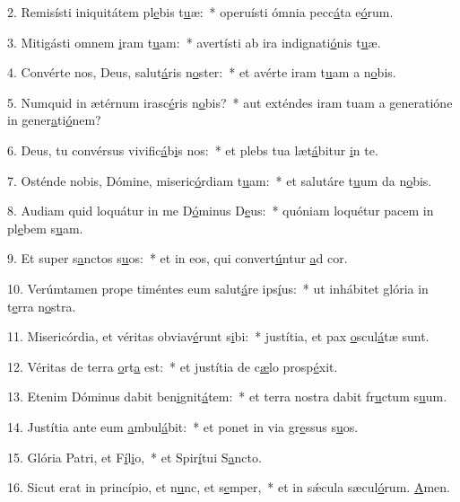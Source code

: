 2. Remisísti iniquitátem pl\uline{e}bis t\uline{u}æ:~* operuísti ómnia pecc\uline{á}ta e\uline{ó}rum.\par 
3. Mitigásti omnem \uline{i}ram t\uline{u}am:~* avertísti ab ira indignati\uline{ó}nis t\uline{u}æ.\par 
4. Convérte nos, Deus, salut\uline{á}ris n\uline{o}ster:~* et avérte iram t\uline{u}am a n\uline{o}bis.\par 
5. Numquid in ætérnum irasc\uline{é}ris n\uline{o}bis?~* aut exténdes iram tuam a generatióne in gener\uline{a}ti\uline{ó}nem?\par 
6. Deus, tu convérsus vivific\uline{á}b\uline{i}s nos:~* et plebs tua læt\uline{á}bitur \uline{i}n te.\par 
7. Osténde nobis, Dómine, miseric\uline{ó}rdiam t\uline{u}am:~* et salutáre t\uline{u}um da n\uline{o}bis.\par 
8. Audiam quid loquátur in me D\uline{ó}minus D\uline{e}us:~* quóniam loquétur pacem in pl\uline{e}bem s\uline{u}am.\par 
9. Et super s\uline{a}nctos s\uline{u}os:~* et in eos, qui convert\uline{ú}ntur \uline{a}d cor.\par 
10. Verúmtamen prope timéntes eum salut\uline{á}re ips\uline{í}us:~* ut inhábitet glória in t\uline{e}rra n\uline{o}stra.\par 
11. Misericórdia, et véritas obviav\uline{é}runt s\uline{i}bi:~* justítia, et pax \uline{o}scul\uline{á}tæ sunt.\par 
12. Véritas de terra \uline{o}rt\uline{a} est:~* et justítia de c\uline{æ}lo prosp\uline{é}xit.\par 
13. Etenim Dóminus dabit ben\uline{i}gnit\uline{á}tem:~* et terra nostra dabit fr\uline{u}ctum s\uline{u}um.\par 
14. Justítia ante eum \uline{a}mbul\uline{á}bit:~* et ponet in via gr\uline{e}ssus s\uline{u}os.\par 
15. Glória Patri, et F\uline{í}l\uline{i}o,~* et Spir\uline{í}tui S\uline{a}ncto.\par 
16. Sicut erat in princípio, et n\uline{u}nc, et s\uline{e}mper,~* et in sǽcula sæcul\uline{ó}rum. \uline{A}men.\par 
